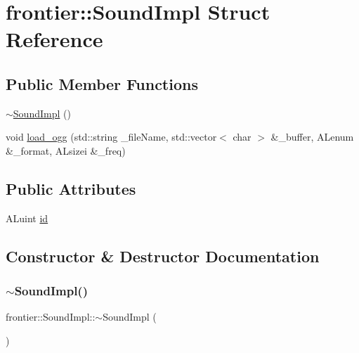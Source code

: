 \hypertarget{structfrontier_1_1_sound_impl}{}\section{frontier\+:\+:Sound\+Impl Struct Reference}
\label{structfrontier_1_1_sound_impl}
\subsection*{Public Member Functions}
\begin{DoxyCompactItemize}
\item 
\hyperlink{structfrontier_1_1_sound_impl_af5689c9a50ec077e5f29747db97015b9}{$\sim$\+Sound\+Impl} ()
\item 
void \hyperlink{structfrontier_1_1_sound_impl_aa7170ec2e5d847deda459543a38670e0}{load\+\_\+ogg} (std\+::string \+\_\+file\+Name, std\+::vector$<$ char $>$ \&\+\_\+buffer, A\+Lenum \&\+\_\+format, A\+Lsizei \&\+\_\+freq)
\end{DoxyCompactItemize}
\subsection*{Public Attributes}
\begin{DoxyCompactItemize}
\item 
A\+Luint \hyperlink{structfrontier_1_1_sound_impl_ae8b2e75a8ca0784b44f0e167d69a1128}{id}
\end{DoxyCompactItemize}


\subsection{Constructor \& Destructor Documentation}
\mbox{\label{structfrontier_1_1_sound_impl_af5689c9a50ec077e5f29747db97015b9}} 
\subsubsection{\texorpdfstring{$\sim$\+Sound\+Impl()}{~SoundImpl()}}
{\footnotesize\ttfamily frontier\+::\+Sound\+Impl\+::$\sim$\+Sound\+Impl (\begin{DoxyParamCaption}{ }\end{DoxyParamCaption})\hspace{0.3cm}{\ttfamily [inline]}}



